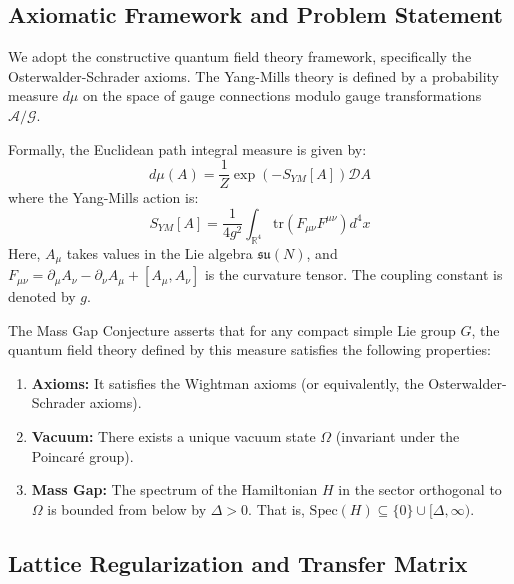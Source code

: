 
\subsection{Axiomatic Framework and Problem Statement}
\label{subsec:axiomatic}

We adopt the constructive quantum field theory framework, specifically the Osterwalder-Schrader axioms. The Yang-Mills theory is defined by a probability measure $d\mu$ on the space of gauge connections modulo gauge transformations $\mathcal{A}/\mathcal{G}$.

\begin{definition}
Formally, the Euclidean path integral measure is given by:
\begin{equation}
d\mu(A) = \frac{1}{Z} \exp\left( -S_{YM}[A] \right) \mathcal{D}A
\end{equation}
where the Yang-Mills action is:
\begin{equation}
S_{YM}[A] = \frac{1}{4g^2} \int_{\mathbb{R}^4} \text{tr}(F_{\mu\nu}F^{\mu\nu}) d^4x
\end{equation}
Here, $A_\mu$ takes values in the Lie algebra $\mathfrak{su}(N)$, and $F_{\mu\nu} = \partial_\mu A_\nu - \partial_\nu A_\mu + [A_\mu, A_\nu]$ is the curvature tensor. The coupling constant is denoted by $g$.
\end{definition}

The Mass Gap Conjecture asserts that for any compact simple Lie group $G$, the quantum field theory defined by this measure satisfies the following properties:
\begin{enumerate}
    \item \textbf{Axioms:} It satisfies the Wightman axioms (or equivalently, the Osterwalder-Schrader axioms).
    \item \textbf{Vacuum:} There exists a unique vacuum state $\Omega$ (invariant under the Poincaré group).
    \item \textbf{Mass Gap:} The spectrum of the Hamiltonian $H$ in the sector orthogonal to $\Omega$ is bounded from below by $\Delta > 0$. That is, $\text{Spec}(H) \subseteq \{0\} \cup [\Delta, \infty)$.
\end{enumerate}

\subsection{Lattice Regularization and Transfer Matrix}
\label{subsec:transfer}

